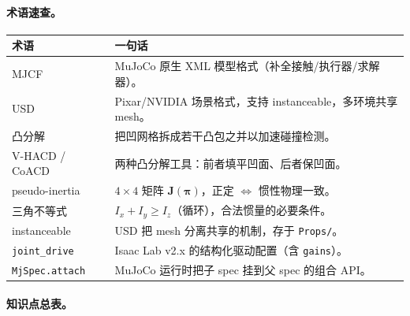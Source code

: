 \paragraph{术语速查。}

\begin{center}
\small
\begin{tabular}{@{}ll@{}}
\toprule
术语 & 一句话 \\
\midrule
MJCF & MuJoCo 原生 XML 模型格式（补全接触/执行器/求解器）。 \\
USD & Pixar/NVIDIA 场景格式，支持 instanceable，多环境共享 mesh。 \\
凸分解 & 把凹网格拆成若干凸包之并以加速碰撞检测。 \\
V-HACD / CoACD & 两种凸分解工具：前者填平凹面、后者保凹面。 \\
pseudo-inertia & $4\times4$ 矩阵 $\mathbf{J}(\boldsymbol\pi)$，正定 $\iff$ 惯性物理一致。 \\
三角不等式 & $I_x+I_y\ge I_z$（循环），合法惯量的必要条件。 \\
instanceable & USD 把 mesh 分离共享的机制，存于 \texttt{Props/}。 \\
\texttt{joint\_drive} & Isaac Lab v2.x 的结构化驱动配置（含 \texttt{gains}）。 \\
\texttt{MjSpec.\allowbreak attach} & MuJoCo 运行时把子 spec 挂到父 spec 的组合 API。 \\
\bottomrule
\end{tabular}
\end{center}

\paragraph{知识点总表。}

